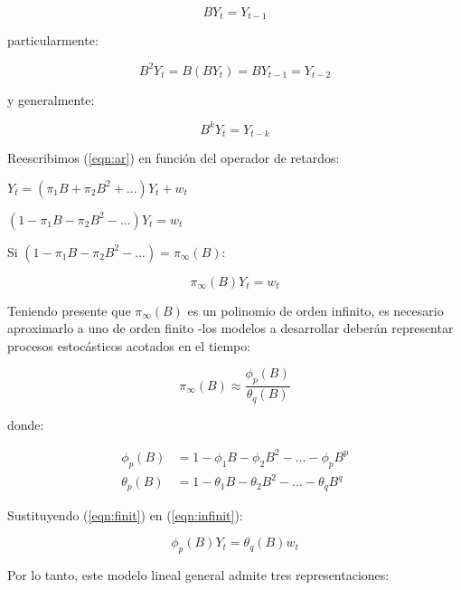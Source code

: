 \documentclass[a4paper,10pt]{article}
\begin{document}
\begin{equation}
BY_t = Y_{t-1}
\end{equation}

particularmente:

\begin{equation*}
B^2Y_t = B(BY_t) = BY_{t-1} = Y_{t-2}
\end{equation*}

y generalmente:

\begin{equation}
B^kY_t = Y_{t-k}
\end{equation}

Reescribimos (\ref{eqn:ar}) en función del operador de retardos:

\begin{center}
$Y_t = (\pi_1B + \pi_2B^2 + ...) Y_t + w_t$

$(1-\pi_1B - \pi_2 B^2 - ...) Y_t = w_t$
\end{center}

Si $(1-\pi_1B - \pi_2 B^2 - ...) = \pi_\infty(B)$:

\begin{equation}\label{eqn:infinit}
\pi_\infty(B)Y_t = w_t
\end{equation}

Teniendo presente que $\pi_\infty(B)$ es un polinomio de orden infinito, es necesario aproximarlo a uno de orden finito -los modelos a desarrollar deberán representar procesos estocásticos acotados en el tiempo:

\begin{equation}\label{eqn:finit}
\pi_\infty(B) \approx \frac{\phi_p(B)}{\theta_q(B)}
\end{equation}

donde:

\begin{equation}
\begin{split}
\phi_p(B) &= 1 - \phi_1B - \phi_2B^2 - ... - \phi_pB^p \\
\theta_p(B) &= 1 - \theta_1B - \theta_2B^2 - ... - \theta_qB^q
\end{split}
\end{equation}

Sustituyendo (\ref{eqn:finit}) en (\ref{eqn:infinit}):

\begin{equation}
\phi_p(B) Y_t = \theta_q (B) w_t
\end{equation}

Por lo tanto, este modelo lineal general admite tres representaciones:
\end{document}
